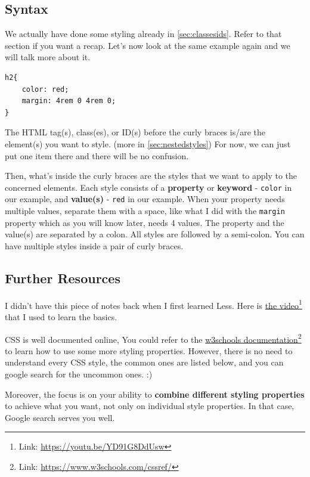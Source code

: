 \subsection*{Syntax}

We actually have done some styling already in \cref{sec:classesids}. Refer to that section if you want a recap.
Let's now look at the same example again and we will talk more about it.

\begin{lstlisting}[language=pug]
h2{
    color: red;
    margin: 4rem 0 4rem 0;
}
\end{lstlisting}

The HTML tag(s), class(es), or ID(s) before the curly braces is/are the element(s) you want to style. (more in \cref{sec:nestedstyles}) For now, we can just put one item there and there will be no confusion.
\vspace{6mm}

Then, what's inside the curly braces are the styles that we want to apply to the concerned elements. Each style consists of a \textbf{property} or \textbf{keyword} - \texttt{color} in our example, and \textbf{value(s)} - \texttt{red} in our example. When your property needs multiple values, separate them with a space, like what I did with the \texttt{margin} property which as you will know later, needs 4 values. The property and the value(s) are separated by a colon. All styles are followed by a semi-colon. You can have multiple styles inside a pair of curly braces. 
\vspace{6mm}

\subsection*{Further Resources}

I didn't have this piece of notes back when I first learned Less. Here is \href{https://youtu.be/YD91G8DdUsw}{the video}\footnote{Link: \url{https://youtu.be/YD91G8DdUsw}} that I used to learn the basics. 

CSS is well documented online, You could refer to the \href{https://www.w3schools.com/cssref/}{w3schools documentation}\footnote{Link: \url{https://www.w3schools.com/cssref/}} to learn how to use some more styling properties. 
However, there is no need to understand every CSS style, the common ones are listed below, and you can google search for the uncommon ones. :)

Moreover, the focus is on your ability to \textbf{combine different styling properties} to achieve what you want, not only on individual style properties. In that case, Google search serves you well. 

